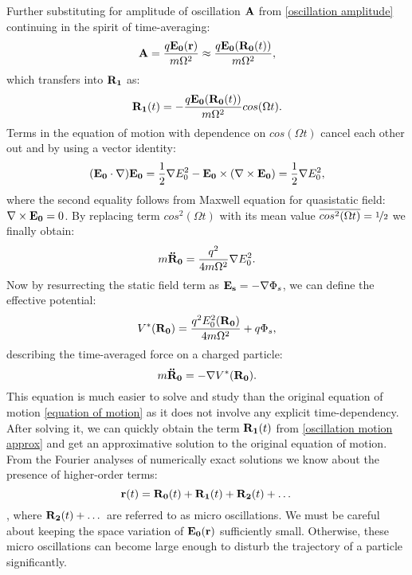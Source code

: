 Further substituting for amplitude of oscillation $\vb{A}$ from \eqref{oscillation amplitude} continuing in the spirit of time-averaging:
\begin{equation}
	\vb{A} = \frac{q \vb{E_0}(\vb{r})}{m \Omega^2} \approx \frac{q \vb{E_0}(\vb{R_0}(t))}{m \Omega^2},
\end{equation}
which transfers into $\vb{R_1}$ as:
\begin{equation}
	\label{oscillation motion approx}
	\vb{R_1}(t) = - \frac{q \vb{E_0}(\vb{R_0}(t))}{m \Omega^2} cos(\Omega t). 
\end{equation}
Terms in the equation of motion with dependence on $cos(\Omega t)$ cancel each other out and by using a vector identity:
\begin{equation}
	(\vb{E_0} \cdot \nabla) \vb{E_0} = \frac{1}{2} \nabla E_0^2 - \vb{E_0} \times (\nabla \times \vb{E_0}) = \frac{1}{2} \nabla E_0^2,
\end{equation}
where the second equality follows from Maxwell equation for quasistatic field: \\ $\nabla \times \vb{E_0} = 0$. By replacing term $cos^2(\Omega t)$ with its mean value $\overline{cos^2(\Omega t)} = \nicefrac{1}{2}$ we finally obtain:
\begin{equation}
	m \vb{\ddot{R}_0} = \frac{q^2}{4 m \Omega^2} \nabla E_0^2.
\end{equation}
Now by resurrecting the static field term as $\vb{E_s} = - \nabla \Phi_s$, we can define the effective potential:
\begin{equation}
	\label{effective potential}
	V^*(\vb{R_0}) = \frac{q^2 E_0^2(\vb{R_0})}{4 m \Omega^2} + q \Phi_s, 
\end{equation}
describing the time-averaged force on a charged particle:
\begin{equation}
	\label{effective equation of motion}
	m \vb{\ddot{R}_0} = - \nabla V^*(\vb{R_0}). 
\end{equation}
This equation is much easier to solve and study than the original equation of motion \eqref{equation of motion} as it does not involve any explicit time-dependency. After solving it, we can quickly obtain the term $\vb{R_1}(t)$ from \eqref{oscillation motion approx} and get an approximative solution to the original equation of motion. From the Fourier analyses of numerically exact solutions \cite{gerlich1992inhomogeneous} we know about the presence of higher-order terms: $$\vb{r}(t) = \vb{R_0}(t) + \vb{R_1}(t) + \vb{R_2}(t) + \dots$$, where $\vb{R_2}(t) + \dots$ are referred to as micro oscillations. We must be careful about keeping the space variation of $\vb{E_0}(\vb{r})$ sufficiently small. Otherwise, these micro oscillations can become large enough to disturb the trajectory of a particle significantly.

